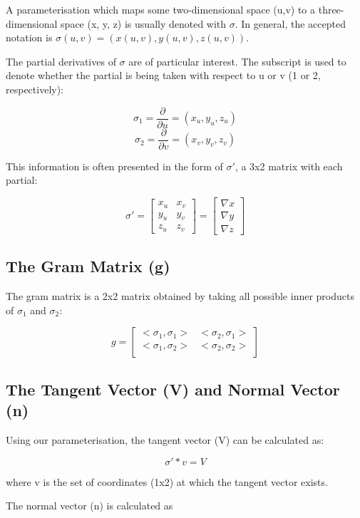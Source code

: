 \documentclass{article}
\begin{document}
A parameterisation which maps some two-dimensional space (u,v) to a three-dimensional space (x, y, z) is usually denoted with $\sigma$. In general, the accepted notation is $\sigma(u,v) = (x(u,v), y(u,v), z(u,v))$.

The partial derivatives of $\sigma$ are of particular interest. The subscript is used to denote whether the partial is being taken with respect to u or v (1 or 2, respectively):

\[ \sigma_{1} = \frac{\partial}{\partial u} = (x_{u}, y_{u}, z_{u})\]
\[  \sigma_{2} = \frac{\partial}{\partial v} = (x_{v}, y_{v}, z_{v}) \]

This information is often presented in the form of $\sigma'$, a 3x2 matrix with each partial:

\[
  \sigma' =
  \begin{bmatrix}
x_{u} & x_{v} \\
y_{u} & y_{v} \\
z_{u} & z_{v}
\end{bmatrix}
=
\begin{bmatrix}
\nabla x \\
\nabla y \\
\nabla z
\end{bmatrix}
 \]
 
 \subsection{The Gram Matrix (g)}
 
 The gram matrix is a 2x2 matrix obtained by taking all possible inner products of $\sigma_1$ and $\sigma_2$:
 
 \[g =  \begin{bmatrix}
<\sigma_1, \sigma_1> & <\sigma_2, \sigma_1> \\
<\sigma_1, \sigma_2> & <\sigma_2, \sigma_2> \\
\end{bmatrix}\]

\subsection{The Tangent Vector (V) and Normal Vector (n)}

Using our parameterisation, the tangent vector (V) can be calculated as:

\[ \sigma' * v = V \]

where v is the set of coordinates (1x2) at which the tangent vector exists.

The normal vector (n) is calculated as
\end{document}
